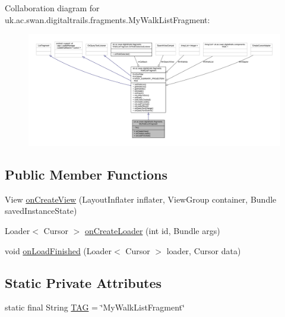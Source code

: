 Collaboration diagram for uk.\+ac.\+swan.\+digitaltrails.\+fragments.\+My\+Walk\+List\+Fragment\+:
\nopagebreak
\begin{figure}[H]
\begin{center}
\leavevmode
\includegraphics[width=350pt]{classuk_1_1ac_1_1swan_1_1digitaltrails_1_1fragments_1_1_my_walk_list_fragment__coll__graph}
\end{center}
\end{figure}
\subsection*{Public Member Functions}
\begin{DoxyCompactItemize}
\item 
View \hyperlink{classuk_1_1ac_1_1swan_1_1digitaltrails_1_1fragments_1_1_my_walk_list_fragment_ab888051fe0203adcc4228d56994758e8}{on\+Create\+View} (Layout\+Inflater inflater, View\+Group container, Bundle saved\+Instance\+State)
\item 
Loader$<$ Cursor $>$ \hyperlink{classuk_1_1ac_1_1swan_1_1digitaltrails_1_1fragments_1_1_my_walk_list_fragment_a26d49064b2f1cfac6655e3c03137a550}{on\+Create\+Loader} (int id, Bundle args)
\item 
void \hyperlink{classuk_1_1ac_1_1swan_1_1digitaltrails_1_1fragments_1_1_my_walk_list_fragment_a9d9b68b38772c829efc202840031b364}{on\+Load\+Finished} (Loader$<$ Cursor $>$ loader, Cursor data)
\end{DoxyCompactItemize}
\subsection*{Static Private Attributes}
\begin{DoxyCompactItemize}
\item 
static final String \hyperlink{classuk_1_1ac_1_1swan_1_1digitaltrails_1_1fragments_1_1_my_walk_list_fragment_aba9cd5cc2bc22c63bca7f52bab9b06db}{T\+A\+G} = \char`\"{}My\+Walk\+List\+Fragment\char`\"{}
\end{DoxyCompactItemize}
